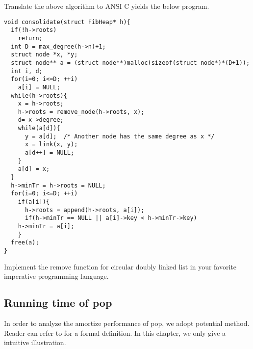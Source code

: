 \documentclass{article}
\begin{document}



Translate the above algorithm to ANSI C yields the below program.

\lstset{language = C}
\begin{lstlisting}
void consolidate(struct FibHeap* h){
  if(!h->roots)
    return;
  int D = max_degree(h->n)+1;
  struct node *x, *y;
  struct node** a = (struct node**)malloc(sizeof(struct node*)*(D+1));
  int i, d;
  for(i=0; i<=D; ++i)
    a[i] = NULL;
  while(h->roots){
    x = h->roots;
    h->roots = remove_node(h->roots, x);
    d= x->degree;
    while(a[d]){ 
      y = a[d];  /* Another node has the same degree as x */
      x = link(x, y);
      a[d++] = NULL;
    }
    a[d] = x;
  }
  h->minTr = h->roots = NULL;
  for(i=0; i<=D; ++i)
    if(a[i]){
      h->roots = append(h->roots, a[i]);
      if(h->minTr == NULL || a[i]->key < h->minTr->key)
	h->minTr = a[i];
    }
  free(a);
}
\end{lstlisting}

\begin{Exercise}
Implement the remove function for circular doubly linked list in your favorite
imperative programming language.
\end{Exercise}

\subsection{Running time of pop}

In order to analyze the amortize performance of pop,
we adopt potential method. Reader can refer to \cite{CLRS} for a formal
definition. In this chapter, we only give a intuitive illustration.
\end{document}
